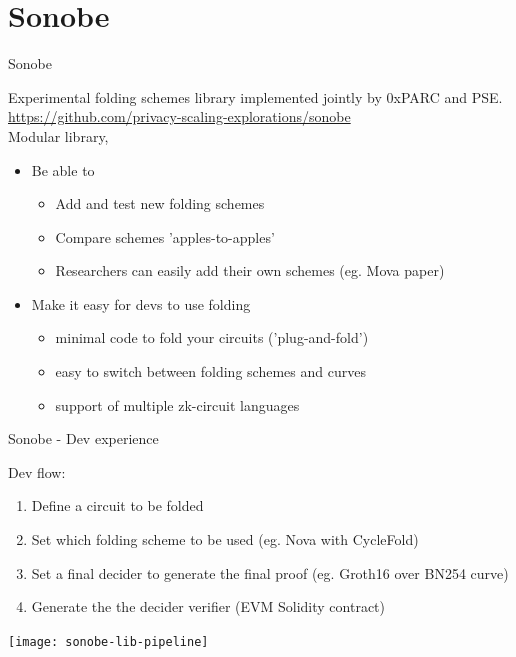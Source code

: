 \documentclass[t]{beamer}
\begin{document}
\section{Sonobe}
\begin{frame}{Sonobe}

  \footnotesize{
  Experimental folding schemes library implemented jointly by 0xPARC and PSE.\\
  \href{https://github.com/privacy-scaling-explorations/sonobe}{https://github.com/privacy-scaling-explorations/sonobe}
  \\Modular library,
  \begin{itemize}
    \item Be able to
    \begin{itemize}
      \item Add and test new folding schemes
      \item Compare schemes 'apples-to-apples'
      \item Researchers can easily add their own schemes (eg. Mova paper)
    \end{itemize}
    \item Make it easy for devs to use folding
    \begin{itemize}
      \item minimal code to fold your circuits ('plug-and-fold')
      \item easy to switch between folding schemes and curves
      \item support of multiple zk-circuit languages
    \end{itemize}
  \end{itemize}
  }
\end{frame}

\begin{frame}{Sonobe - Dev experience}
  \footnotesize{

  Dev flow:
  \begin{enumerate}
    \item Define a circuit to be folded
    \item Set which folding scheme to be used (eg. Nova with CycleFold)
    \item Set a final decider to generate the final proof (eg. Groth16 over BN254 curve)
    \item Generate the the decider verifier (EVM Solidity contract)
  \end{enumerate}
  }

  \vspace{1cm}

  \texttt{[image: sonobe-lib-pipeline]}
\end{frame}
\end{document}
